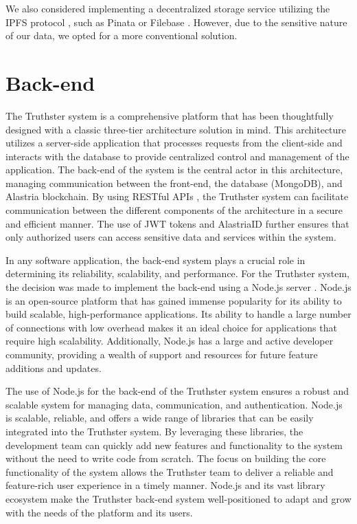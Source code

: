 \documentclass[target=mst,aauheader=]{thud}
\begin{document}
We also considered implementing a decentralized storage service utilizing the IPFS protocol \cite{ipfs}, such as Pinata \cite{pinata} or Filebase \cite{filebase}. However, due to the sensitive nature of our data, we opted for a more conventional solution.

\section{Back-end}

The Truthster system is a comprehensive platform that has been thoughtfully designed with a classic three-tier architecture \cite{3tierArchitecture} solution in mind. This architecture utilizes a server-side application that processes requests from the client-side and interacts with the database to provide centralized control and management of the application. The back-end of the system is the central actor in this architecture, managing communication between the front-end, the database (MongoDB), and Alastria blockchain. By using RESTful APIs \cite{restAPI}, the Truthster system can facilitate communication between the different components of the architecture in a secure and efficient manner. The use of JWT tokens \cite{jwtTokens} and AlastriaID further ensures that only authorized users can access sensitive data and services within the system.\par
In any software application, the back-end system plays a crucial role in determining its reliability, scalability, and performance. For the Truthster system, the decision was made to implement the back-end using a Node.js server \cite{nodeJs}. Node.js is an open-source platform that has gained immense popularity for its ability to build scalable, high-performance applications. Its ability to handle a large number of connections with low overhead makes it an ideal choice for applications that require high scalability. Additionally, Node.js has a large and active developer community, providing a wealth of support and resources for future feature additions and updates.\par
The use of Node.js for the back-end of the Truthster system ensures a robust and scalable system for managing data, communication, and authentication. Node.js is scalable, reliable, and offers a wide range of libraries that can be easily integrated into the Truthster system. By leveraging these libraries, the development team can quickly add new features and functionality to the system without the need to write code from scratch. The focus on building the core functionality of the system allows the Truthster team to deliver a reliable and feature-rich user experience in a timely manner. Node.js and its vast library ecosystem make the Truthster back-end system well-positioned to adapt and grow with the needs of the platform and its users.\par
\end{document}
